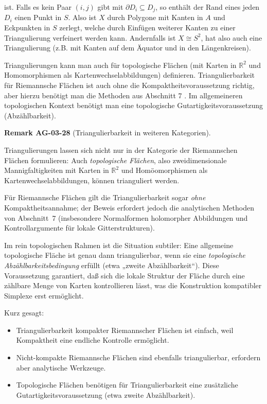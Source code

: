 \documentclass[10pt, letterpaper]{article}
\newcommand{\CustomHeading}[3]{%
  \par\medskip\noindent%
  \textbf{#1 #2} \textnormal{(#3)}.\enskip%
}
\newenvironment{REM}[2]{\begin{unitbox}\CustomHeading{Remark}{#1}{#2}}{\end{unitbox}}
\begin{document}
ist. Falls es kein Paar $(i, j)$ gibt mit $\partial D_{i} \subseteq D_{j}$, so enthält der Rand eines jeden $D_{i}$ einen Punkt in $S$. Also ist $X$ durch Polygone mit Kanten in $A$ und Eckpunkten in $S$ zerlegt, welche durch Einfügen weiterer Kanten zu einer Triangulierung verfeinert werden kann. Andernfalls ist $X \cong S^{2}$, hat also auch eine Triangulierung (z.B. mit Kanten auf dem Äquator und in den Längenkreisen).

Triangulierungen kann man auch für topologische Flächen (mit Karten in $\mathbb{R}^{2}$ und Homomorphismen als Kartenwechselabbildungen) definieren. Triangulierbarkeit für Riemannsche Flächen ist auch ohne die Kompaktheitsvoraussetzung richtig, aber hierzu benötigt man die Methoden aus Abschnitt 7 . Im allgemeineren topologischen Kontext benötigt man eine topologische Gutartigkeitsvoraussetzung (Abzählbarkeit).

\begin{REM}{AG-03-28}{Triangulierbarkeit in weiteren Kategorien}
Triangulierungen lassen sich nicht nur in der Kategorie der
Riemannschen Flächen formulieren: Auch \emph{topologische Flächen},
also zweidimensionale Mannigfaltigkeiten mit Karten in $\mathbb{R}^2$
und Homöomorphismen als Kartenwechselabbildungen, können
trianguliert werden.

\medskip

Für Riemannsche Flächen gilt die Triangulierbarkeit sogar \emph{ohne}
Kompaktheitsannahme; der Beweis erfordert jedoch die analytischen
Methoden von Abschnitt~7 (insbesondere Normalformen holomorpher
Abbildungen und Kontrollargumente für lokale Gitterstrukturen).

\medskip

Im rein topologischen Rahmen ist die Situation subtiler:
Eine allgemeine topologische Fläche ist genau dann triangulierbar,
wenn sie eine \emph{topologische Abzählbarkeitsbedingung} erfüllt
(etwa „zweite Abzählbarkeit“). Diese Voraussetzung garantiert, daß
sich die lokale Struktur der Fläche durch eine zählbare Menge von
Karten kontrollieren lässt, was die Konstruktion kompatibler Simplexe
erst ermöglicht.

\medskip

Kurz gesagt:
\begin{itemize}
  \item Triangulierbarkeit kompakter Riemannscher Flächen ist einfach,
        weil Kompaktheit eine endliche Kontrolle ermöglicht.
  \item Nicht-kompakte Riemannsche Flächen sind ebenfalls triangulierbar,
        erfordern aber analytische Werkzeuge.
  \item Topologische Flächen benötigen für Triangulierbarkeit
        eine zusätzliche Gutartigkeitsvoraussetzung
        (etwa zweite Abzählbarkeit).
\end{itemize}
\end{REM}
\end{document}
